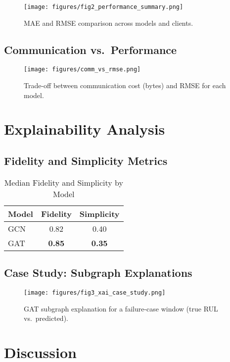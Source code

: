 \documentclass[journal]{IEEEtran}
\begin{document}
\begin{figure}[!t]
  \centering
  \texttt{[image: figures/fig2\_performance\_summary.png]}
  \caption{MAE and RMSE comparison across models and clients.}
  \label{fig:perf}
\end{figure}

\subsection{Communication vs.\ Performance}
\begin{figure}[!t]
  \centering
  \texttt{[image: figures/comm\_vs\_rmse.png]}
  \caption{Trade-off between communication cost (bytes) and RMSE for each model.}
  \label{fig:comm}
\end{figure}

\section{Explainability Analysis}
\label{sec:xai}
\subsection{Fidelity and Simplicity Metrics}
\begin{table}[!t]
  \caption{Median Fidelity and Simplicity by Model}
  \label{tab:xai_metrics}
  \centering
  \begin{tabular}{lcc}
    \toprule
    Model & Fidelity & Simplicity \\
    \midrule
    GCN & 0.82 & 0.40 \\
    GAT & \textbf{0.85} & \textbf{0.35} \\
    \bottomrule
  \end{tabular}
\end{table}

\subsection{Case Study: Subgraph Explanations}
\begin{figure}[!t]
  \centering
  \texttt{[image: figures/fig3\_xai\_case\_study.png]}
  \caption{GAT subgraph explanation for a failure-case window (true RUL vs.\ predicted).}
  \label{fig:case}
\end{figure}

\section{Discussion}
\label{sec:discussion}
\end{document}
